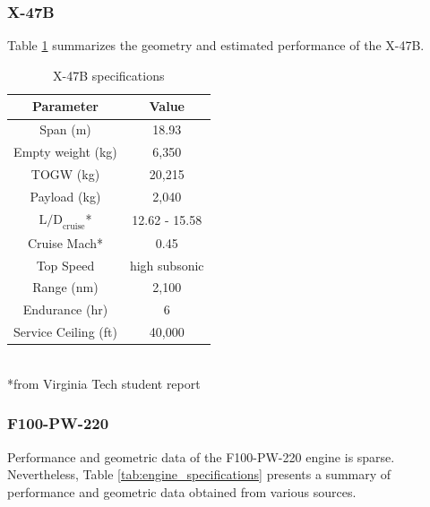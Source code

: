 \documentclass{article}
\begin{document}
\subsubsection{X-47B}
Table \ref{tab:x47b_specifications} summarizes the geometry and estimated performance of the X-47B.

\begin{table}
\caption{X-47B specifications}
\label{tab:x47b_specifications}
\begin{center}
\begin{tabular}[]{c | c }
Parameter & Value \\
\hline
Span (m) & 18.93 \\
Empty weight (kg) & 6,350 \\
TOGW (kg) & 20,215 \\
Payload (kg) & 2,040 \\
 $\textrm{L/D}_{\textrm{cruise}}$* & 12.62 - 15.58 \\
Cruise Mach* & 0.45 \\
Top Speed & high subsonic \\
Range (nm) & 2,100 \\
Endurance (hr) & 6 \\
Service Ceiling (ft) & 40,000 \\
\end{tabular} \\
\footnotesize{*from Virginia Tech student report}
\end{center}
\end{table}

\subsubsection{F100-PW-220}

Performance and geometric data of the F100-PW-220 engine is sparse. Nevertheless, Table \ref{tab:engine_specifications} presents a summary of performance and geometric data obtained from various sources.
\end{document}
